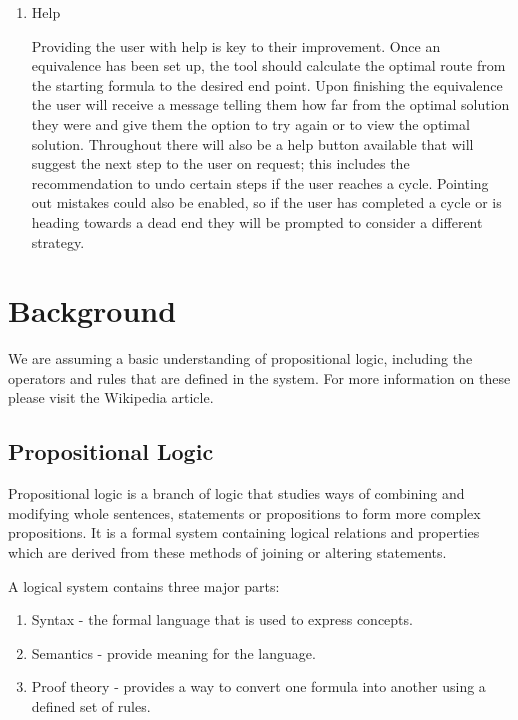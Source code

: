 \documentclass{report}
\begin{document}
\begin{enumerate}
\item Help

Providing the user with help is key to their improvement. Once an equivalence has been set up, the tool should calculate the optimal route from the starting formula to the desired end point. Upon finishing the equivalence the user will receive a message telling them how far from the optimal solution they were and give them the option to try again or to view the optimal solution. Throughout there will also be a help button available that will suggest the next step to the user on request; this includes the recommendation to undo certain steps if the user reaches a cycle. Pointing out mistakes could also be enabled, so if the user has completed a cycle or is heading towards a dead end they will be prompted to consider a different strategy.

\end{enumerate}


\chapter{Background}

We are assuming a basic understanding of propositional logic, including the operators and rules that are defined in the system. For more information on these please visit the Wikipedia article\cite{propositionalwiki}.

\section{Propositional Logic}

Propositional logic is a branch of logic that studies ways of combining and modifying whole sentences, statements or propositions to form more complex propositions. It is a formal system containing logical relations and properties which are derived from these methods of joining or altering statements.

A logical system contains three major parts:

\begin{enumerate}
\item Syntax - the formal language that is used to express concepts.
\item Semantics - provide meaning for the language.
\item Proof theory - provides a way to convert one formula into another using a defined set of rules.
\end{enumerate}
\end{document}
